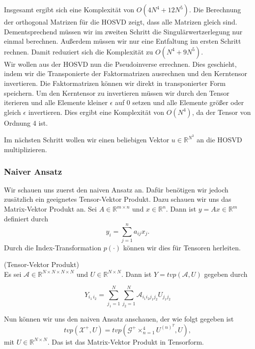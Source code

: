 Insgesamt ergibt sich eine Komplexität von $O(4N^4  + 12N^5)$. 
Die Berechnung der orthogonal Matrizen für die HOSVD zeigt, dass alle Matrizen gleich sind. Dementsprechend müssen wir im zweiten Schritt die Singulärwertzerlegung nur einmal berechnen. Außerdem müssen wir nur eine Entfaltung im ersten Schritt rechnen. Damit reduziert sich die Komplexität zu $O(N^4  + 9N^5)$. \\

Wir wollen aus der HOSVD nun die Pseudoinverse errechnen. Dies geschieht, indem wir die Transponierte der Faktormatrizen ausrechnen und den Kerntensor invertieren. Die Faktormatrizen können wir direkt in transponierter Form speichern. Um den Kerntensor zu invertieren müssen wir durch den Tensor iterieren und alle Elemente kleiner $\epsilon$ auf 0 setzen und alle Elemente größer oder gleich $\epsilon$ invertieren.
Dies ergibt eine Komplexität von $O(N^4)$, da der Tensor von Ordnung 4 ist.

Im nächsten Schritt wollen wir einen beliebigen Vektor $u \in \mathbb{R}^{N^3}$ an die HOSVD multiplizieren.

\subsubsection{Naiver Ansatz}
Wir schauen uns zuerst den naiven Ansatz an. Dafür benötigen wir jedoch zusätzlich ein geeignetes Tensor-Vektor Produkt. 
Dazu schauen wir uns das Matrix-Vektor Produkt an. Sei $A \in \mathbb{R}^{m \times n}$ und $x \in \mathbb{R}^{n}$. Dann ist $y=Ax \in \mathbb{R}^{m}$ definiert durch
\begin{equation*}
y_i = \sum\limits_{j=1}^{n} a_{ij} x_j.
\end{equation*}
Durch die Index-Transformation $p(\cdot)$ können wir dies für Tensoren herleiten.

\begin{Definition} (Tensor-Vektor Produkt) \\
Es sei $\mathcal{A} \in \mathbb{R}^{N \times N \times N \times N}$ und $U \in \mathbb{R}^{N \times N}$.
Dann ist $Y=tvp(\mathcal{A},U)$ gegeben durch

\begin{equation*}
Y_{i_1 \, i_2} = \sum\limits_{j_1=1}^{N} \sum\limits_{j_2=1}^{N} \mathcal{A}_{i_1 i_2 j_1 j_2} U_{j_1 j_2}
\end{equation*}

\end{Definition}

Nun können wir uns den naiven Ansatz anschauen, der wie folgt gegeben ist
\begin{equation} \label{eq:pinv}
tvp(\mathscr{X}^{+},U) = tvp(\mathscr{G}^{+} \times_{n=1}^{4} U^{ (n) ^{T} },U) ,
\end{equation} 
mit $U \in \mathbb{R}^{N \times N}$. Das ist das Matrix-Vektor Produkt in Tensorform. 

